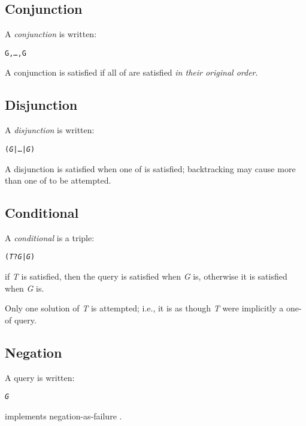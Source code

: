 \subsection{Conjunction}
\label{goal:conjunction}

A \emph{conjunction} is written:
\begin{alltt}
G,\ldots,G\subn
\end{alltt}
A conjunction is satisfied if all of  are satisfied \emph{in their original order}.

\subsection{Disjunction}
\label{goal:disjunction}

A \emph{disjunction} is written:
\begin{alltt}
(\emph{G} | \ldots | \emph{G\subn})
\end{alltt}
A disjunction is satisfied when one of  is satisfied; backtracking may cause more than one of  to be attempted.

\subsection{Conditional}
\label{goal:conditional}

A \emph{conditional} is a triple:
\begin{alltt}
(\emph{T}?\emph{G}|\emph{G})
\end{alltt}
if \emph{T} is satisfied, then the query is satisfied when \emph{G} is, otherwise it is satisfied when \emph{G} is.

Only one solution of \emph{T} is attempted; i.e., it is as though \emph{T} were implicitly a one-of query.

\subsection{Negation}
\label{goal:negation}

A  query is written:
\begin{alltt}
\nasf{} \emph{G}
\end{alltt}
\go implements negation-as-failure \cite{klc:78}.

